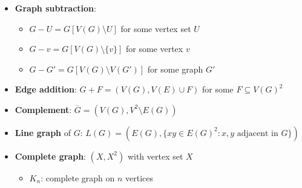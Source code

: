 \begin{itemize}
  \item \textbf{Graph subtraction}:
  \begin{itemize}
    \item $ G - U = G[V(G) \setminus U] $ for some vertex set $ U $
    \item $ G - v = G[V(G) \setminus \{ v \}] $ for some vertex $ v $ 
    \item $ G - G' = G[V(G) \setminus V(G')] $ for some graph $ G' $
  \end{itemize}
  \item \textbf{Edge addition}: $ G + F = (V(G), V(E) \cup F) $ for some $ F \subseteq V(G)^2 $
  \item \textbf{Complement}: $ \overline{G} = (V(G), V^2 \setminus E(G)) $
  \item \textbf{Line graph} of $ G $: $ L(G) = (E(G), \{ xy \in E(G)^2 : x,y \text{ adjacent in } G \}) $ 
  \item \textbf{Complete graph}: $ (X, X^2) $ with vertex set $ X $
  \begin{itemize}
    \item $ K_n $: complete graph on $ n $ vertices 
  \end{itemize}
\end{itemize}

